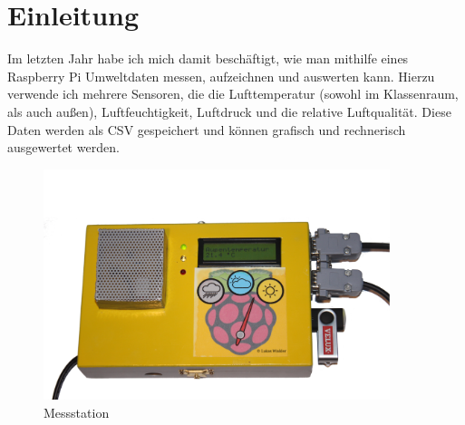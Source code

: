 \chapter{Einleitung}

Im letzten Jahr habe ich mich damit beschäftigt, wie man mithilfe eines Raspberry Pi Umweltdaten messen, aufzeichnen und auswerten kann. Hierzu verwende ich mehrere Sensoren, die die Lufttemperatur (sowohl im Klassenraum, als auch außen), Luftfeuchtigkeit, Luftdruck und die relative Luftqualität. Diese Daten werden als \gls{CSV} gespeichert und können grafisch und rechnerisch ausgewertet werden.
\begin{figure}[h]
  \centering
     \includegraphics[width=0.9\textwidth]{figures/gesamt.png}
  \caption{Messstation}
  \label{fig:gesamt}
\end{figure}